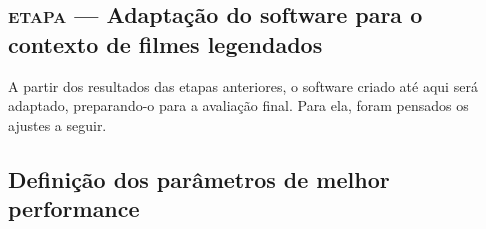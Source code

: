 \documentclass[a4paper,11pt,titlepage,singlespacing]{article}
\newcommand{\etapa}[1]{\textsc{etapa \oldstylenums{#1}}}
\begin{document}


\subsection{\etapa{3} — Adaptação do software para o contexto de filmes legendados}
\label{subsec:etapa3}

A partir dos resultados das etapas anteriores, o software criado até aqui será adaptado, preparando-o para a avaliação final. Para ela, foram pensados os ajustes a seguir.

\subsection*{Definição dos parâmetros de melhor performance}

\end{document}
